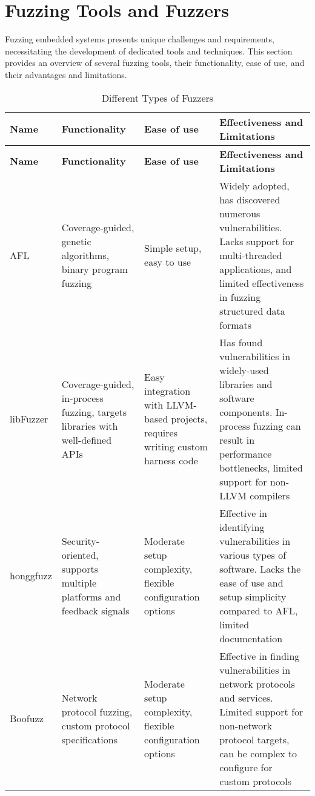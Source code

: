 \section{Fuzzing Tools and Fuzzers}

Fuzzing embedded systems presents unique challenges and requirements, necessitating the development
of dedicated tools and techniques. This section provides an overview of several fuzzing tools,
their functionality, ease of use, and their advantages and limitations.

\begin{longtable}{p{2.5cm}p{3cm}p{3cm}p{5cm}}
\caption{Different Types of Fuzzers}
\label{tab:fuzzers_table} \\
\toprule
\textbf{Name} & \textbf{Functionality} & \textbf{Ease of use} & \textbf{Effectiveness and Limitations} \\
\midrule
\endfirsthead
\toprule
\textbf{Name} & \textbf{Functionality} & \textbf{Ease of use} & \textbf{Effectiveness and Limitations} \\
\midrule
\endhead
AFL\cite{zalewski2014american}\cite{GitHubgo92:online} & Coverage-guided, genetic algorithms, binary program fuzzing & Simple setup, easy to use & Widely adopted, has discovered numerous vulnerabilities. Lacks support for multi-threaded applications, and limited effectiveness in fuzzing structured data formats \\
\midrule
libFuzzer\cite{libFuzze17:online} & Coverage-guided, in-process fuzzing, targets libraries with well-defined APIs & Easy integration with LLVM-based projects, requires writing custom harness code & Has found vulnerabilities in widely-used libraries and software components. In-process fuzzing can result in performance bottlenecks, limited support for non-LLVM compilers \\
\midrule
honggfuzz\cite{GitHubgo89:online} & Security-oriented, supports multiple platforms and feedback signals & Moderate setup complexity, flexible configuration options & Effective in identifying vulnerabilities in various types of software. Lacks the ease of use and setup simplicity compared to AFL, limited documentation \\
\midrule
Boofuzz\cite{pereyda2019boofuzz} & Network protocol fuzzing, custom protocol specifications & Moderate setup complexity, flexible configuration options & Effective in finding vulnerabilities in network protocols and services. Limited support for non-network protocol targets, can be complex to configure for custom protocols \\

\end{longtable}
